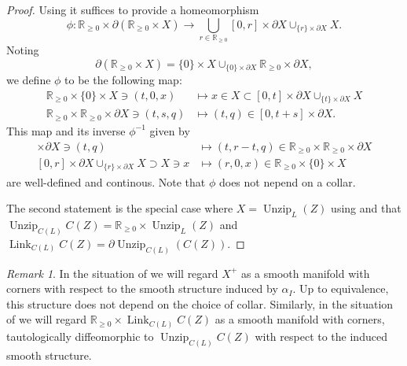 \documentclass[]{amsart}
\newcommand{\mbb}[1]{\mathbb{#1}}
\newcommand{\R}{\mbb{R}}
\DeclareMathOperator{\Unzip}{Unzip}
\DeclareMathOperator{\Link}{Link}
\numberwithin{equation}{section}
\theoremstyle{definition}
\theoremstyle{remark}
\newtheorem{remark}[equation]{Remark}
\theoremstyle{plain}
\begin{document}
\begin{proof}
    Using  it suffices to provide a homeomorphism
    \[
        \phi\colon\R_{\geq0}\times\partial(\R_{\geq0}\times X)\to\bigcup_{r\in\R_{\geq0}}[0,r]\times\partial X\cup_{\{r\}\times\partial X}X.
    \]
    Noting 
    \[
        \partial(\R_{\geq0}\times X)=\{0\}\times X\cup_{\{0\}\times \partial X}\R_{\geq0}\times\partial X,
    \] 
    we define $\phi$ to be the following map: 
    \begin{align*}
        \R_{\geq0}\times\{0\}\times X\ni (t,0,x)&\mapsto x\in X\subset[0,t]\times \partial X\cup_{\{t\}\times\partial X}X\\
        \R_{\geq0}\times\R_{\geq0}\times\partial X\ni(t,s,q)&\mapsto (t,q)\in[0,t+s]\times\partial X.
    \end{align*}
    This map and its inverse $\phi^{-1}$ given by
    \begin{align*}
        [0,r]\times\partial X \ni (t,q) &\mapsto (t,r-t,q)\in \R_{\geq0}\times\R_{\geq0}\times\partial X\\
        [0,r]\times\partial X\cup_{\{r\}\times\partial X}X\supset X\ni x&\mapsto (r,0,x)\in\R_{\geq0}\times\{0\}\times X
    \end{align*}
    are well-defined and continous. Note that $\phi$ does not nepend on a collar.

    The second statement is the special case where $X=\Unzip_L(Z)$ using  and that $\Unzip_{C(L)} C(Z)=\R_{\geq0}\times \Unzip_L(Z)$ and $\Link_{C(L)}C(Z)=\partial\Unzip_{C(L)}(C(Z))$.  
\end{proof}

\begin{remark}
    In the situation of  we will regard $X^+$ as a smooth manifold with corners with respect to the smooth structure induced by $\alpha_I$. Up to equivalence, this structure does not depend on the choice of collar. Similarly, in the situation of  we will regard $\R_{\geq0}\times\Link_{C(L)}C(Z)$ as a smooth manifold with corners, tautologically diffeomorphic to $\Unzip_{C(L)}C(Z)$ with respect to the induced smooth structure.
\end{remark}
\end{document}
